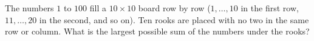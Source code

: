 The numbers $1$ to $100$ fill a $10\times10$ board row by row ($1,\dots,10$ in the first row, $11,\dots,20$ in the second, and so on). Ten rooks are placed with no two in the same row or column. What is the largest possible sum of the numbers under the rooks?
